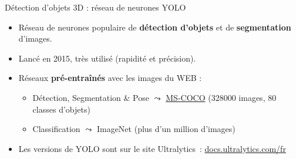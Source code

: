 \documentclass[11pt,serif,mathserif,compress,hyperref={colorlinks}]{beamer}
\begin{document}
\begin{frame}{Détection d'objets 3D : réseau de neurones YOLO}
  
  \begin{tcolorbox}[title={Réseau de neurones \textbf{YOLO} ({\em You Only Look Once})}]
    \begin{itemize}
      \item Réseau de neurones populaire de \textbf{détection d'objets} et de \textbf{segmentation} d'images.
      \item Lancé en 2015, très utilisé (rapidité et précision).
      \item Réseaux \textbf{pré-entraînés} avec les images du WEB :
        \begin{itemize}
        \item Détection, Segmentation \& Pose $\leadsto$ \href{https://paperswithcode.com/dataset/coco}{MS-COCO} (328000 images, 80 classes d'objets)
        \item Classification $\leadsto$ ImageNet (plus d'un million d'images)
        \end{itemize}
      \item Les versions de YOLO sont sur le site Ultralytics : \href{https://docs.ultralytics.com/fr}{docs.ultralytics.com/fr}
    \end{itemize}
  \end{tcolorbox}
    
\end{frame}
\end{document}
